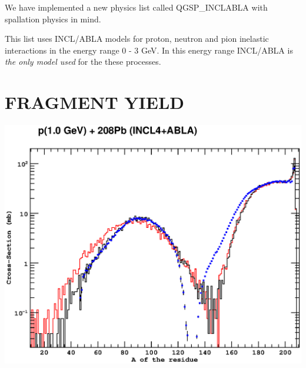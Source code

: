 \documentclass[20pt]{article}
\newenvironment{textbox}
{\begin{lrbox}{\dummybox}\begin{minipage}{0.9\columnwidth}}
{\end{minipage}\end{lrbox}\raisebox{-\depth}{\psshadowbox[framesep=1em,framearc=.1,shadow=true]{\usebox{\dummybox}}}\vspace{0.005\textheight}}
\begin{document}
\begin{center}
\begin{multicols}{3}
\begin{textbox}
{\color{udsect}

We have implemented a new physics list called {\sf QGSP\_\-INCL\-ABLA} with
spallation physics in mind. 
}

\vspace{1cm}
This list uses INCL/ABLA models for proton,
neutron and pion inelastic interactions in the energy range 0 - 3
GeV. In this energy range INCL/ABLA is \emph{the only model used} for the
these processes.

\end{textbox}

\vspace{4cm}
\section*{{\Huge {\sf FRAGMENT YIELD}}}
\vspace{-1cm}
\begin{center}

\includegraphics[scale=0.70]{images/fragments.eps}


\end{center}
\end{multicols}
\end{center}
\end{document}

